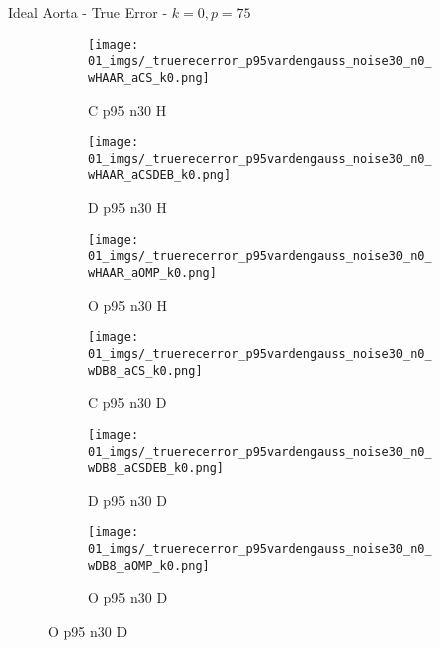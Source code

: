 \begin{frame}{Ideal Aorta - True Error - $k=0,p=75$}{}
\begin{figure}
\begin{subfigure}{0.13\textwidth}
\texttt{[image: 01\_imgs/\_truerecerror\_p95vardengauss\_noise30\_n0\_wHAAR\_aCS\_k0.png]}
\caption*{\tiny C p95 n30 H}
\end{subfigure}
\begin{subfigure}{0.13\textwidth}
\texttt{[image: 01\_imgs/\_truerecerror\_p95vardengauss\_noise30\_n0\_wHAAR\_aCSDEB\_k0.png]}
\caption*{\tiny D p95 n30 H}
\end{subfigure}
\begin{subfigure}{0.13\textwidth}
\texttt{[image: 01\_imgs/\_truerecerror\_p95vardengauss\_noise30\_n0\_wHAAR\_aOMP\_k0.png]}
\caption*{\tiny O p95 n30 H}
\end{subfigure}
\begin{subfigure}{0.13\textwidth}
\texttt{[image: 01\_imgs/\_truerecerror\_p95vardengauss\_noise30\_n0\_wDB8\_aCS\_k0.png]}
\caption*{\tiny C p95 n30 D}
\end{subfigure}
\begin{subfigure}{0.13\textwidth}
\texttt{[image: 01\_imgs/\_truerecerror\_p95vardengauss\_noise30\_n0\_wDB8\_aCSDEB\_k0.png]}
\caption*{\tiny D p95 n30 D}
\end{subfigure}
\begin{subfigure}{0.13\textwidth}
\texttt{[image: 01\_imgs/\_truerecerror\_p95vardengauss\_noise30\_n0\_wDB8\_aOMP\_k0.png]}
\caption*{\tiny O p95 n30 D}
\end{subfigure}
\end{figure}
\end{frame}
